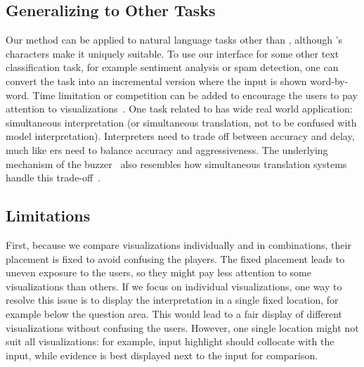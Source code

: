 
\subsection{Generalizing to Other Tasks}
Our method can be applied to natural language tasks other than
\qb{}, although \qb{}'s characters make it uniquely suitable.  To use
our interface for some other text classification task, for example
sentiment analysis or spam detection, one can convert the task into an
incremental version where the input is shown
word-by-word. Time limitation or competition can be added to
encourage the users to pay attention to
visualizations~\cite{narayanan2018humans}. One task
related to \qb{} has wide real world application: simultaneous
interpretation (or simultaneous translation, not to be
confused with model interpretation). Interpreters need to trade off
between accuracy and delay, much like \qb{}ers need to balance
accuracy and aggressiveness. The underlying mechanism of the
 buzzer~\cite{he2016opponent} also resembles how
simultaneous translation systems handle this
trade-off~\cite{Grissom-14}.

\subsection{Limitations}
First, because we
compare visualizations individually and in combinations, their
placement is fixed to avoid confusing the players. The fixed
placement leads to uneven exposure to the users, so they might pay
less attention to some visualizations than others. If we focus on
individual visualizations, one way to resolve this issue is to display
the interpretation in a single fixed location, for example below the
question area. This would lead to a fair display of different
visualizations without confusing the users. However, one single
location might not suit all visualizations: for example, input
highlight should collocate with the input, while evidence is best
displayed next to the input for comparison.

